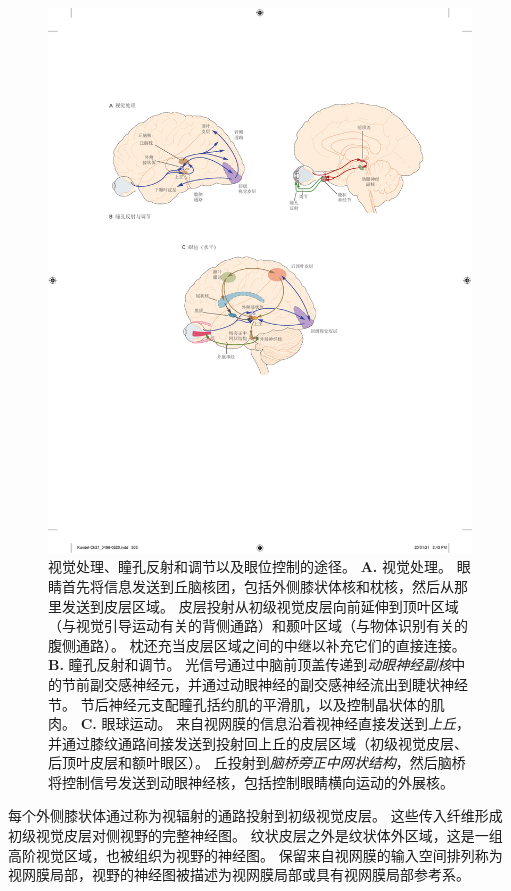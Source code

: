 \begin{figure}[htbp]
	\centering
	\includegraphics[width=1.0\linewidth]{chap21/fig_21_6}
	\caption{视觉处理、瞳孔反射和调节以及眼位控制的途径。
		\textbf{A.} 视觉处理。
		眼睛首先将信息发送到丘脑核团，包括外侧膝状体核和枕核，然后从那里发送到皮层区域。
		皮层投射从初级视觉皮层向前延伸到顶叶区域（与视觉引导运动有关的背侧通路）和颞叶区域（与物体识别有关的腹侧通路）。
		枕还充当皮层区域之间的中继以补充它们的直接连接。
		\textbf{B.} 瞳孔反射和调节。
		光信号通过中脑前顶盖传递到\textit{动眼神经副核}中的节前副交感神经元，并通过动眼神经的副交感神经流出到睫状神经节。
		节后神经元支配瞳孔括约肌的平滑肌，以及控制晶状体的肌肉。
		\textbf{C.} 眼球运动。
		来自视网膜的信息沿着视神经直接发送到\textit{上丘}，并通过膝纹通路间接发送到投射回上丘的皮层区域（初级视觉皮层、后顶叶皮层和额叶眼区）。
		丘投射到\textit{脑桥旁正中网状结构}，然后脑桥将控制信号发送到动眼神经核，包括控制眼睛横向运动的外展核。}
	\label{fig:21_6}
\end{figure}


每个外侧膝状体通过称为视辐射的通路投射到初级视觉皮层。
这些传入纤维形成初级视觉皮层对侧视野的完整神经图。 
纹状皮层之外是纹状体外区域，这是一组高阶视觉区域，也被组织为视野的神经图。
保留来自视网膜的输入空间排列称为视网膜局部，视野的神经图被描述为视网膜局部或具有视网膜局部参考系。



